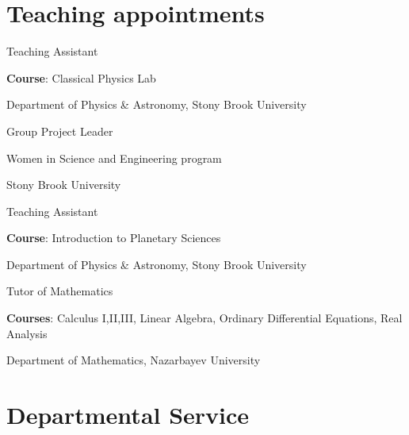 \documentclass[10pt]{article} %
\begin{document}
\begin{paracol}{1}
\section{Teaching appointments} 
	{Teaching Assistant}
	{\textbf{Course}: Classical Physics Lab
	
	Department of Physics \& Astronomy, Stony Brook University}

	{Group Project Leader}
	{ Women in Science and Engineering program
	
	Stony Brook University}
	
	{Teaching Assistant}
	{\textbf{Course}: Introduction to Planetary Sciences
	
	Department of Physics \& Astronomy, Stony Brook University}
	
	
	{Tutor of Mathematics}
	{\textbf{Courses}: Calculus I,II,III, Linear Algebra, Ordinary Differential Equations, Real Analysis
	
	Department of Mathematics, Nazarbayev University}

	

\section{Departmental Service}





\end{paracol}
\end{document}
